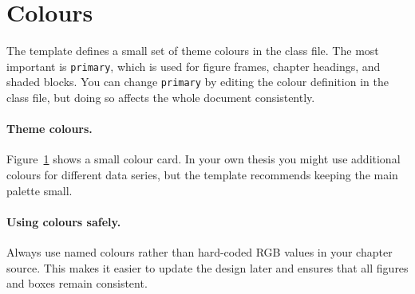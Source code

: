 \section{Colours}\label{ch4sec:colours}

The template defines a small set of theme colours in the class file. The most important is \texttt{primary}, which is used for figure frames, chapter headings, and shaded blocks. You can change \texttt{primary} by editing the colour definition in the class file, but doing so affects the whole document consistently.

\paragraph{Theme colours.} Figure~\ref{ch4fig:colours} shows a small colour card. In your own thesis you might use additional colours for different data series, but the template recommends keeping the main palette small.

\begin{figure}[h]
\centering
{}
\label{ch4fig:colours}
\end{figure}

\paragraph{Using colours safely.} Always use named colours rather than hard-coded RGB values in your chapter source. This makes it easier to update the design later and ensures that all figures and boxes remain consistent.
